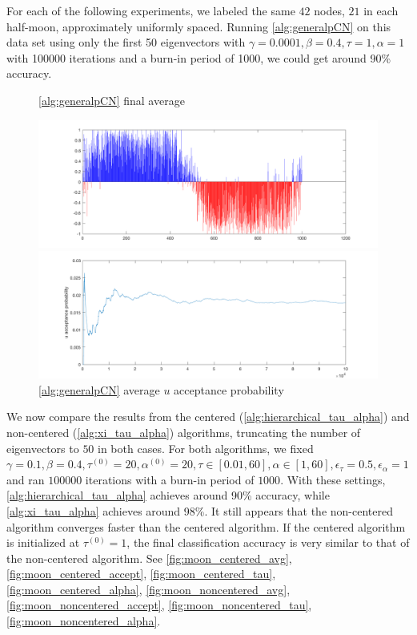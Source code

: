 \documentclass{siamart1116}
\begin{document}
    For each of the following experiments, we labeled the same $42$ nodes, $21$ in each half-moon, approximately uniformly spaced. Running \cref{alg:generalpCN} on this data set using only the first 50 eigenvectors with $\gamma=0.0001,\beta=0.4,\tau=1,\alpha=1$ with 100000 iterations and a burn-in period of 1000, we could get around 90\% accuracy.
    \begin{figure}[!htb]
        \begin{minipage}{0.48\textwidth}
            \centering
            \caption{\label{fig:moon_mcmc_gamma_avg} \cref{alg:generalpCN} final average}
            \includegraphics[width=\linewidth]{graphics/moons/mcmc_gamma/u_avg.png}
        \end{minipage} \hfill
        \begin{minipage}{0.48\textwidth}
            \centering
            \caption{\label{fig:moon_mcmc_gamma_accept} \cref{alg:generalpCN} average $u$ acceptance probability}
            \includegraphics[width=\linewidth]{graphics/moons/mcmc_gamma/u_accept.png}
        \end{minipage}
    \end{figure}

    We now compare the results from the centered (\cref{alg:hierarchical_tau_alpha}) and non-centered (\cref{alg:xi_tau_alpha}) algorithms, truncating the number of eigenvectors to $50$ in both cases. For both algorithms, we fixed $\gamma = 0.1, \beta = 0.4, \tau^{(0)}=20,\alpha^{(0)}=20,\tau\in[0.01,60],\alpha\in[1,60],\epsilon_\tau=0.5,\epsilon_\alpha=1$ and ran $100000$ iterations with a burn-in period of $1000$. With these settings, \cref{alg:hierarchical_tau_alpha} achieves around 90\% accuracy, while \cref{alg:xi_tau_alpha} achieves around 98\%. It still appears that the non-centered algorithm converges faster than the centered algorithm. If the centered algorithm is initialized at $\tau^{(0)} = 1$, the final classification accuracy is very similar to that of the non-centered algorithm. See \cref{fig:moon_centered_avg}, \cref{fig:moon_centered_accept}, \cref{fig:moon_centered_tau}, \cref{fig:moon_centered_alpha}, \cref{fig:moon_noncentered_avg}, \cref{fig:moon_noncentered_accept}, \cref{fig:moon_noncentered_tau}, \cref{fig:moon_noncentered_alpha}.
\end{document}
